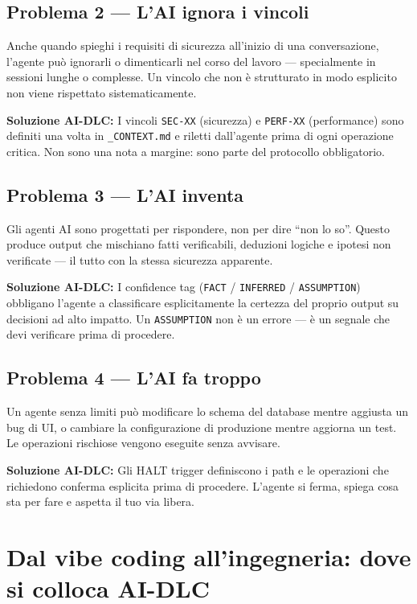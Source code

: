 \subsection*{Problema 2 --- L'AI ignora i vincoli}

Anche quando spieghi i requisiti di sicurezza all'inizio di una conversazione, l'agente può ignorarli o dimenticarli nel corso del lavoro --- specialmente in sessioni lunghe o complesse. Un vincolo che non è strutturato in modo esplicito non viene rispettato sistematicamente.

\textbf{Soluzione AI-DLC:} I vincoli \texttt{SEC-XX} (sicurezza) e \texttt{PERF-XX} (performance) sono definiti una volta in \texttt{\_CONTEXT.md} e riletti dall'agente prima di ogni operazione critica. Non sono una nota a margine: sono parte del protocollo obbligatorio.

\subsection*{Problema 3 --- L'AI inventa}

Gli agenti AI sono progettati per rispondere, non per dire ``non lo so''. Questo produce output che mischiano fatti verificabili, deduzioni logiche e ipotesi non verificate --- il tutto con la stessa sicurezza apparente.

\textbf{Soluzione AI-DLC:} I confidence tag (\texttt{FACT} / \texttt{INFERRED} / \texttt{ASSUMPTION}) obbligano l'agente a classificare esplicitamente la certezza del proprio output su decisioni ad alto impatto. Un \texttt{ASSUMPTION} non è un errore --- è un segnale che devi verificare prima di procedere.

\subsection*{Problema 4 --- L'AI fa troppo}

Un agente senza limiti può modificare lo schema del database mentre aggiusta un bug di UI, o cambiare la configurazione di produzione mentre aggiorna un test. Le operazioni rischiose vengono eseguite senza avvisare.

\textbf{Soluzione AI-DLC:} Gli HALT trigger definiscono i path e le operazioni che richiedono conferma esplicita prima di procedere. L'agente si ferma, spiega cosa sta per fare e aspetta il tuo via libera.

\section{Dal vibe coding all'ingegneria: dove si colloca AI-DLC}
\label{sec:01-vibe-coding}

